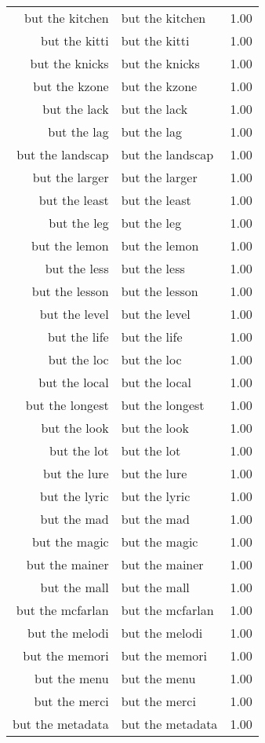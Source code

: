 \begin{table}[ht]
\begin{tabular}{rlr}
  but the kitchen & but the kitchen & 1.00 \\ 
  but the kitti & but the kitti & 1.00 \\ 
  but the knicks & but the knicks & 1.00 \\ 
  but the kzone & but the kzone & 1.00 \\ 
  but the lack & but the lack & 1.00 \\ 
  but the lag & but the lag & 1.00 \\ 
  but the landscap & but the landscap & 1.00 \\ 
  but the larger & but the larger & 1.00 \\ 
  but the least & but the least & 1.00 \\ 
  but the leg & but the leg & 1.00 \\ 
  but the lemon & but the lemon & 1.00 \\ 
  but the less & but the less & 1.00 \\ 
  but the lesson & but the lesson & 1.00 \\ 
  but the level & but the level & 1.00 \\ 
  but the life & but the life & 1.00 \\ 
  but the loc & but the loc & 1.00 \\ 
  but the local & but the local & 1.00 \\ 
  but the longest & but the longest & 1.00 \\ 
  but the look & but the look & 1.00 \\ 
  but the lot & but the lot & 1.00 \\ 
  but the lure & but the lure & 1.00 \\ 
  but the lyric & but the lyric & 1.00 \\ 
  but the mad & but the mad & 1.00 \\ 
  but the magic & but the magic & 1.00 \\ 
  but the mainer & but the mainer & 1.00 \\ 
  but the mall & but the mall & 1.00 \\ 
  but the mcfarlan & but the mcfarlan & 1.00 \\ 
  but the melodi & but the melodi & 1.00 \\ 
  but the memori & but the memori & 1.00 \\ 
  but the menu & but the menu & 1.00 \\ 
  but the merci & but the merci & 1.00 \\ 
  but the metadata & but the metadata & 1.00 \\ 

\end{tabular}
\end{table}

